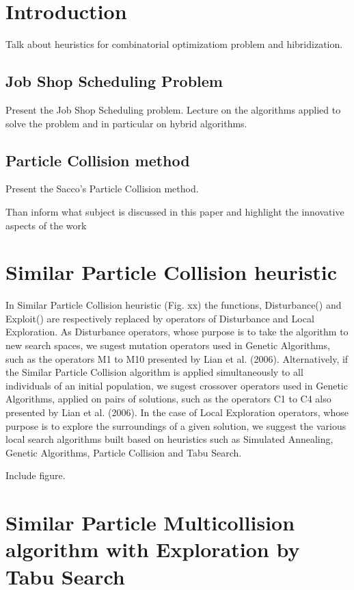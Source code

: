 \section{Introduction}
\label{intro}

Talk about heuristics for combinatorial optimizatiom problem and hibridization.

\subsection{Job Shop Scheduling Problem}
\label{sec:JSSP}

Present the Job Shop Scheduling problem. 
Lecture on the algorithms applied to solve the problem and in particular on hybrid algorithms.


\subsection{Particle Collision method}
\label{sec:PC}

Present the Sacco's Particle Collision method.


Than inform what subject is discussed in this paper and highlight the innovative aspects of the work

\section{Similar Particle Collision heuristic}
\label{sec:SPC}

In Similar Particle Collision heuristic (Fig. xx) the functions, Disturbance() and Exploit() are respectively replaced by operators of Disturbance and Local Exploration. As Disturbance operators, whose purpose is to take the algorithm to new search spaces, we sugest mutation operators used in Genetic Algorithms, such as the operators M1 to M10 presented by Lian et al. (2006). Alternatively, if the Similar Particle Collision algorithm is applied simultaneously to all individuals of an initial population, we sugest crossover operators used in Genetic Algorithms, applied on pairs of solutions, such as the operators C1 to C4 also presented by Lian et al. (2006). In the case of Local Exploration operators, whose purpose is to explore the surroundings of a given solution, we suggest the various local search algorithms built based on heuristics such as Simulated Annealing, Genetic Algorithms, Particle Collision and Tabu Search.

Include figure.

\section{Similar Particle Multicollision algorithm with Exploration by Tabu Search}
\label{sec:SPCETS}


